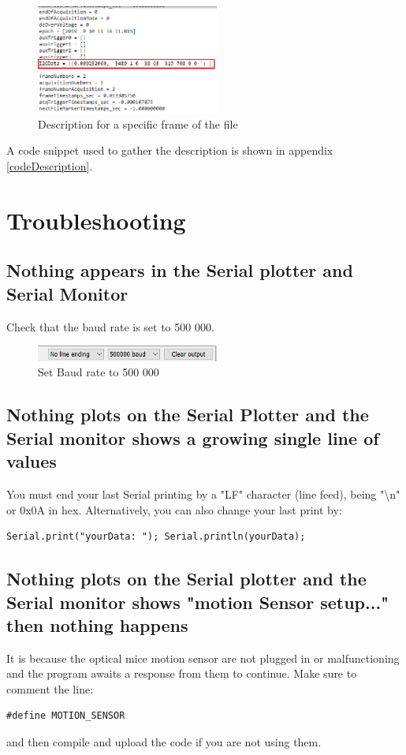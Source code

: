 \documentclass[a4paper]{article}
\begin{document}
\begin{figure}[h!]
    \centering
    \includegraphics[width = 6cm]{images/description.png}
    \caption{Description for a specific frame of the file}
    \label{fig:description}
\end{figure}

A code snippet used to gather the description is shown in appendix \ref{codeDescription}.

\section{Troubleshooting}
\subsection{Nothing appears in the Serial plotter and Serial Monitor}
Check that the baud rate is set to 500 000.

\begin{figure}[h!b!t!]
    \centering
    \includegraphics[width = 6cm]{images/baud.PNG}
    \caption{Set Baud rate to 500 000}
    \label{fig:baud}
\end{figure}

\subsection{Nothing plots on the Serial Plotter and the Serial monitor shows a growing single line of values}
You must end your last Serial printing by a "LF" character (line feed), being "\textbackslash n" or 0x0A in hex. Alternatively, you can also change your last print by: 
\begin{lstlisting}
Serial.print("yourData: "); Serial.println(yourData);
\end{lstlisting}

\subsection{Nothing plots on the Serial plotter and the Serial monitor shows "motion Sensor setup..." then nothing happens}
It is because the optical mice motion sensor are not plugged in or malfunctioning and the program awaits a response from them to continue.
Make sure to comment the line:
\begin{lstlisting}
#define MOTION_SENSOR
\end{lstlisting}
and then compile and upload the code if you are not using them.
\end{document}
